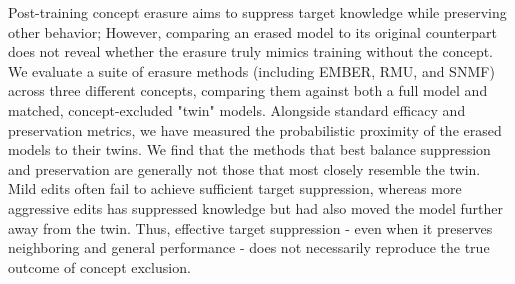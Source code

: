 Post-training concept erasure aims to suppress target knowledge while preserving other behavior; However, comparing an erased model to its original counterpart does not reveal whether the erasure truly mimics training without the concept. We evaluate a suite of erasure methods (including EMBER, RMU, and SNMF) across three different concepts, comparing them against both a full model and matched, concept-excluded "twin" models. Alongside standard efficacy and preservation metrics, we have measured the probabilistic proximity of the erased models to their twins. We find that the methods that best balance suppression and preservation are generally not those that most closely resemble the twin. Mild edits often fail to achieve sufficient target suppression, whereas more aggressive edits has suppressed knowledge but had also moved the model further away from the twin. Thus, effective target suppression - even when it preserves neighboring and general performance - does not necessarily reproduce the true outcome of concept exclusion.
